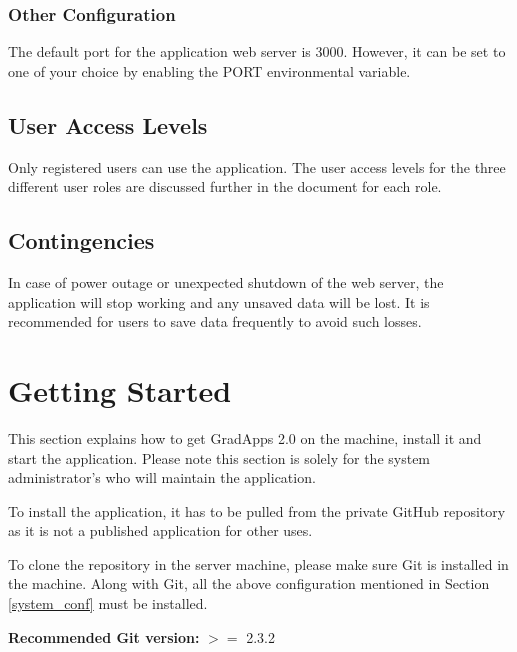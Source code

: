 \documentclass[fontsize=12pt,paper=letter,twoside]{scrartcl}
\begin{document}
\subsubsection{Other Configuration}
The default port for the application web server is 3000. However, it can be set to one of your choice by enabling the PORT environmental variable.

\subsection{User Access Levels}
Only registered users can use the application. The user access levels for the three different user roles are discussed further in the document for each role.

\subsection{Contingencies}
In case of power outage or unexpected shutdown of the web server, the application will stop working and any unsaved data will be lost. It is recommended for users to save data frequently to avoid such losses.

\newpage
\section{Getting Started}
This section explains how to get GradApps 2.0 on the machine, install it and start the application. Please note this section is solely for the system administrator's who will maintain the application.

\bigskip
\noindent To install the application, it has to be pulled from the private GitHub repository as it is not a published application for other uses.

\bigskip
\noindent To clone the repository in the server machine, please make sure Git is installed in the machine. Along with Git, all the above configuration mentioned in Section \ref{system_conf} must be installed.

\bigskip
\noindent \textbf{Recommended Git version:} $>=$ 2.3.2
\end{document}
